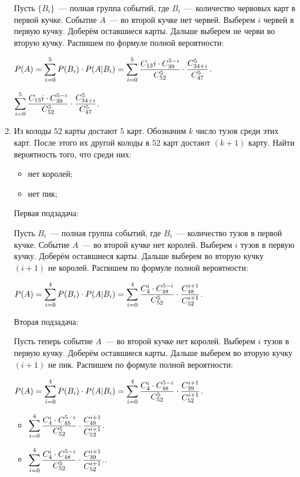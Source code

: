 \documentclass{article}
\begin{document}
\begin{enumerate}
    \solution{}

    Пусть $\{B_i\}$~--- полная группа событий, где $B_i$~--- количество червовых карт в первой кучке. Событие $A$~--- во второй кучке нет червей. Выберем $i$ червей в первую кучку. Доберём оставшиеся карты. Дальше выберем не черви во вторую кучку. Распишем по формуле полной вероятности: 

    $\displaystyle{P(A) = \sum\limits_{i = 0}^5 P(B_i) \cdot P(A|B_i) = \sum\limits_{i = 0}^5 \frac{C_{13}{i} \cdot C_{39}^{5 - i}}{C_{52}^5} \cdot \frac{C_{34 + i}^5}{C_{47} ^ 5}}$.

    \answer{} $\displaystyle{  \sum\limits_{i = 0}^5 \frac{C_{13}{i} \cdot C_{39}^{5 - i}}{C_{52}^5} \cdot \frac{C_{34 + i}^5}{C_{47} ^ 5}}$.

    \item Из колоды $52$ карты достают $5$ карт. Обозначим $k$ число тузов среди этих карт. После этого их другой колоды в $52$ карт достают $(k + 1)$ карту. Найти вероятность того, что среди них:
    \begin{itemize}
        \item нет королей;
        \item нет пик;
    \end{itemize}

    \solution{}

    Первая подзадача:

    Пусть ${B_i}$~--- полная группа событий, где $B_i$~--- количество тузов в первой кучке. Событие $A$~--- во второй кучке нет королей. Выберем $i$ тузов в первую кучку. Доберём оставшиеся карты. Дальше выберем во вторую кучку $(i + 1)$ не королей. Распишем по формуле полной вероятности:

    $\displaystyle{P(A) = \sum\limits_{i = 0}^4 P(B_i) \cdot P(A|B_i) = \sum\limits_{i = 0}^4 \frac{C_4^i \cdot C_{48}^{5 - i}}{C_{52}^5} \cdot \frac{C_{48}^{i + 1}}{C_{52}^{i + 1}}}$.

    Вторая подзадача:

    Пусть теперь событие $A$~--- во второй кучке нет королей. Выберем $i$ тузов в первую кучку. Доберём оставшиеся карты. Дальше выберем во вторую кучку $(i + 1)$ не пик. Распишем по формуле полной вероятности:

    $\displaystyle{P(A) = \sum\limits_{i = 0}^4 P(B_i) \cdot P(A|B_i) = \sum\limits_{i = 0}^4 \frac{C_4^i \cdot C_{48}^{5 - i}}{C_{52}^5} \cdot \frac{C_{39}^{i + 1}}{C_{52}^{i + 1}}}$.

    \answer{}

    \begin{itemize}
        \item $\displaystyle{\sum\limits_{i = 0}^4 \frac{C_4^i \cdot C_{48}^{5 - i}}{C_{52}^5} \cdot \frac{C_{48}^{i + 1}}{C_{52}^{i + 1}}}$.
        \item $\displaystyle{\sum\limits_{i = 0}^4 \frac{C_4^i \cdot C_{48}^{5 - i}}{C_{52}^5} \cdot \frac{C_{39}^{i + 1}}{C_{52}^{i + 1}}}$..
    \end{itemize}


\end{enumerate}
\end{document}
